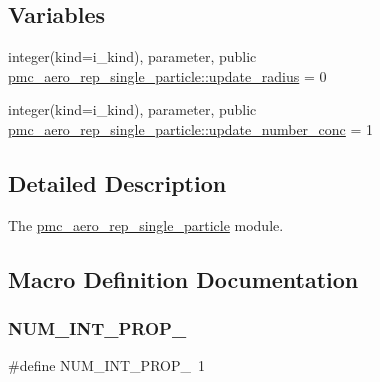 \subsection*{Variables}
\begin{DoxyCompactItemize}
\item 
integer(kind=i\+\_\+kind), parameter, public \mbox{\hyperlink{namespacepmc__aero__rep__single__particle_a7b52abb1a4a88c92c6239fee67487245}{pmc\+\_\+aero\+\_\+rep\+\_\+single\+\_\+particle\+::update\+\_\+radius}} = 0
\item 
integer(kind=i\+\_\+kind), parameter, public \mbox{\hyperlink{namespacepmc__aero__rep__single__particle_a6ff4b5b0738de8bfffb6b6e019bf8489}{pmc\+\_\+aero\+\_\+rep\+\_\+single\+\_\+particle\+::update\+\_\+number\+\_\+conc}} = 1
\end{DoxyCompactItemize}


\subsection{Detailed Description}
The \mbox{\hyperlink{namespacepmc__aero__rep__single__particle}{pmc\+\_\+aero\+\_\+rep\+\_\+single\+\_\+particle}} module. 



\subsection{Macro Definition Documentation}
\mbox{\label{aero__rep__single__particle_8_f90_a13ba1b28e3d8a5e60eec52ce6bbabe4f}} 
\subsubsection{\texorpdfstring{N\+U\+M\+\_\+\+I\+N\+T\+\_\+\+P\+R\+O\+P\+\_\+}{NUM\_INT\_PROP\_}}
{\footnotesize\ttfamily \#define N\+U\+M\+\_\+\+I\+N\+T\+\_\+\+P\+R\+O\+P\+\_\+~1}

\mbox{\label{aero__rep__single__particle_8_f90_aff1191174604af4c86c622f98cd18c17}} 
